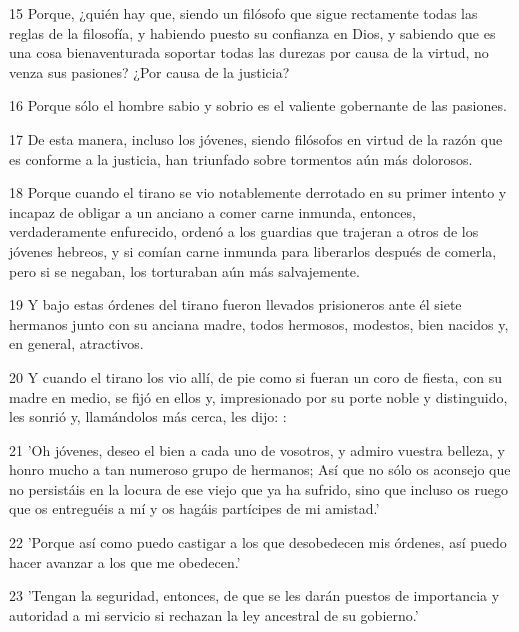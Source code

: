 \par 15 Porque, ¿quién hay que, siendo un filósofo que sigue rectamente todas las reglas de la filosofía, y habiendo puesto su confianza en Dios, y sabiendo que es una cosa bienaventurada soportar todas las durezas por causa de la virtud, no venza sus pasiones? ¿Por causa de la justicia?

\par 16 Porque sólo el hombre sabio y sobrio es el valiente gobernante de las pasiones.

\par 17 De esta manera, incluso los jóvenes, siendo filósofos en virtud de la razón que es conforme a la justicia, han triunfado sobre tormentos aún más dolorosos.

\par 18 Porque cuando el tirano se vio notablemente derrotado en su primer intento y incapaz de obligar a un anciano a comer carne inmunda, entonces, verdaderamente enfurecido, ordenó a los guardias que trajeran a otros de los jóvenes hebreos, y si comían carne inmunda para liberarlos después de comerla, pero si se negaban, los torturaban aún más salvajemente.

\par 19 Y bajo estas órdenes del tirano fueron llevados prisioneros ante él siete hermanos junto con su anciana madre, todos hermosos, modestos, bien nacidos y, en general, atractivos.

\par 20 Y cuando el tirano los vio allí, de pie como si fueran un coro de fiesta, con su madre en medio, se fijó en ellos y, impresionado por su porte noble y distinguido, les sonrió y, llamándolos más cerca, les dijo: :

\par 21 'Oh jóvenes, deseo el bien a cada uno de vosotros, y admiro vuestra belleza, y honro mucho a tan numeroso grupo de hermanos; Así que no sólo os aconsejo que no persistáis en la locura de ese viejo que ya ha sufrido, sino que incluso os ruego que os entreguéis a mí y os hagáis partícipes de mi amistad.'

\par 22 'Porque así como puedo castigar a los que desobedecen mis órdenes, así puedo hacer avanzar a los que me obedecen.'

\par 23 'Tengan la seguridad, entonces, de que se les darán puestos de importancia y autoridad a mi servicio si rechazan la ley ancestral de su gobierno.'

